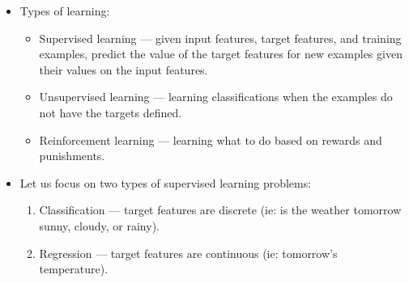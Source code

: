 \documentclass{article}
\begin{document}
\begin{itemize}
    \item Types of learning:
        \begin{itemize}
            \item Supervised learning --- given input features, target features, and training examples, predict the value of the target features for new examples given their values on the input features.
            \item Unsupervised learning --- learning classifications when the examples do not have the targets defined.
            \item Reinforcement learning --- learning what to do based on rewards and punishments.
        \end{itemize}
    \item Let us focus on two types of supervised learning problems:
        \begin{enumerate}
            \item Classification --- target features are discrete (ie: is the weather tomorrow sunny, cloudy, or rainy).
            \item Regression --- target features are continuous (ie: tomorrow's temperature).
        \end{enumerate}
\end{itemize}
\end{document}
